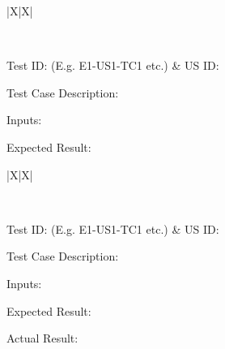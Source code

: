 
{
\setModernTableStyle %
\begin{xltabular}{\textwidth}{|X|X|}

    \hiderowcolors
    \caption{Test Case 1} \label{tab:test_case_ch2_1} \\
    \hline
    \showrowcolors

    Test ID: (E.g. E1-US1-TC1 etc.) & US ID: \\ \hline

    {Test Case Description: } \\ \hline

    {Inputs:} \\ \hline

    {Expected Result:} \\ \hline

\end{xltabular}
}



{
\setModernTableStyle %
\begin{xltabular}{\textwidth}{|X|X|}

    \hiderowcolors
    \caption{Test Case 1} \label{tab:test_case_ch4_1} \\
    \hline
    \showrowcolors

    Test ID: (E.g. E1-US1-TC1 etc.) & US ID: \\ \hline

    {Test Case Description: } \\ \hline

    {Inputs:} \\ \hline

    {Expected Result:} \\ \hline

    {Actual Result:} \\ \hline

\end{xltabular}
}
